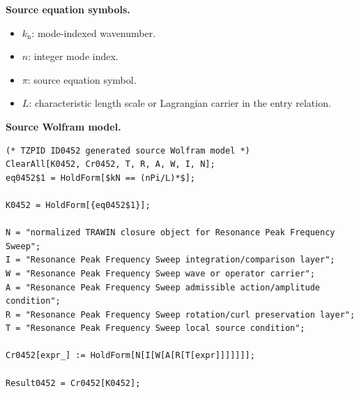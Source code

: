 \begin{minipage}[t]{0.49\linewidth}
\begingroup
\small
\raggedright
\textbf{Source equation symbols.}\par
\begin{itemize}[leftmargin=1.35em,itemsep=1pt,topsep=1pt,parsep=0pt]
    \item $k_{\mathrm{n}}$: mode-indexed wavenumber.
    \item $n$: integer mode index.
    \item $\pi$: source equation symbol.
    \item $L$: characteristic length scale or Lagrangian carrier in the entry relation.
\end{itemize}
\endgroup
\end{minipage}\hfill
\begin{minipage}[t]{0.47\linewidth}
\begingroup
\scriptsize
\raggedright
\textbf{Source Wolfram model.}\par
\begin{Verbatim}[fontsize=\tiny,breaklines=true,breakanywhere=true]
(* TZPID ID0452 generated source Wolfram model *)
ClearAll[K0452, Cr0452, T, R, A, W, I, N];
eq0452$1 = HoldForm[$kN == (nPi/L)*$];

K0452 = HoldForm[{eq0452$1}];

N = "normalized TRAWIN closure object for Resonance Peak Frequency Sweep";
I = "Resonance Peak Frequency Sweep integration/comparison layer";
W = "Resonance Peak Frequency Sweep wave or operator carrier";
A = "Resonance Peak Frequency Sweep admissible action/amplitude condition";
R = "Resonance Peak Frequency Sweep rotation/curl preservation layer";
T = "Resonance Peak Frequency Sweep local source condition";

Cr0452[expr_] := HoldForm[N[I[W[A[R[T[expr]]]]]]];

Result0452 = Cr0452[K0452];
\end{Verbatim}
\endgroup
\end{minipage}

